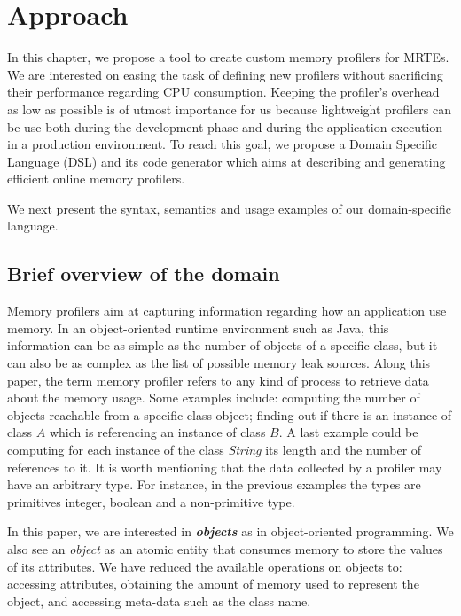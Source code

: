 \section{Approach}\label{sec:approach}

In this chapter, we propose a tool to create custom memory profilers for MRTEs.
We are interested on easing the task of defining new profilers without sacrificing their performance regarding CPU consumption.
Keeping the profiler's overhead as low as possible is of utmost importance for us because lightweight profilers can be use both during the development phase and during the application execution in a production environment.
To reach this goal, we propose a Domain Specific Language (DSL) and its code generator which aims at describing and generating efficient online memory profilers. 

We next present the syntax, semantics and usage examples of our domain-specific language.


\subsection{Brief overview of the domain}

Memory profilers aim at capturing information regarding how an application use memory.
In an object-oriented runtime environment such as Java, this information can be as simple as the number of objects of a specific class, but it can also be  as complex  as the list of possible memory leak sources.
Along this paper, the term memory profiler refers to any kind of process to retrieve data about the memory usage.
Some examples include: computing the number of objects reachable from a specific class object; finding out if there is an instance of class $A$ which is referencing an instance of class $B$.
A last example could be computing for each instance of the class \textit{String} its length and the number of references to it.
It is worth mentioning that the data collected by a profiler may have an arbitrary type.
For instance, in the previous examples the types are primitives integer, boolean and a non-primitive type.


In this paper, we are interested in \textbf{\textit{objects}} as in object-oriented programming.
We also see an \textit{object} as an atomic entity that consumes memory to store the values of its attributes.
We have  reduced the available operations on objects to: accessing attributes, obtaining the amount of memory used to represent the object, and accessing meta-data such as the class name.

